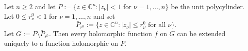 Let $n \geqslant 2$ and let $P := \{ z \in \mathbb{C}^n : |z_\nu| < 1 \text{ for } \nu = 1, \ldots, n \}$ be the unit polycylinder. Let $0 \leqslant r_\nu^0 < 1$ for $\nu = 1, \ldots, n$ and set
$$\bar{P}_{r^0} := \{ z \in \mathbb{C}^n : |z_\nu| \leqslant r_\nu^0 \text{ for all } \nu \}.$$
Let $G := P \setminus \bar{P}_{r^0}$. Then every holomorphic function $f$ on $G$ can be extended uniquely to a function holomorphic on $P$.
